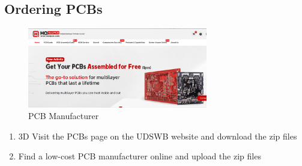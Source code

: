 \subsection{Ordering PCBs}


\begin{figure}[h]
    \centering
    \includegraphics[width=0.7\textwidth]{Figures/Manufacture/pcb_manufacture_example.png}
    \caption{PCB Manufacturer}
    \label{fig:pcbmanufacturer}
  \end{figure}

  \begin{enumerate}
    \item 3D Visit the PCBs page on the UDSWB website and download the zip files
    \item Find a low-cost PCB manufacturer online and upload the zip files
  \end{enumerate}